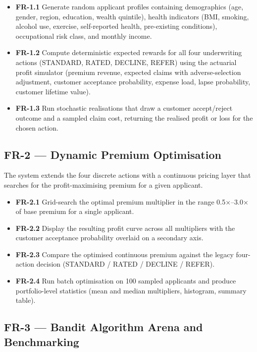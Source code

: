 \begin{itemize}
\tightlist
\item
  \textbf{FR-1.1} Generate random applicant profiles containing demographics (age, gender, region, education, wealth quintile), health indicators (BMI, smoking, alcohol use, exercise, self-reported health, pre-existing conditions), occupational risk class, and monthly income.
\item
  \textbf{FR-1.2} Compute deterministic expected rewards for all four underwriting actions (STANDARD, RATED, DECLINE, REFER) using the actuarial profit simulator (premium revenue, expected claims with adverse-selection adjustment, customer acceptance probability, expense load, lapse probability, customer lifetime value).
\item
  \textbf{FR-1.3} Run stochastic realisations that draw a customer accept/reject outcome and a sampled claim cost, returning the realised profit or loss for the chosen action.
\end{itemize}

\subsection{FR-2 --- Dynamic Premium Optimisation}\label{fr-2-dynamic-premium-optimisation}

The system extends the four discrete actions with a continuous pricing layer that searches for the profit-maximising premium for a given applicant.

\begin{itemize}
\tightlist
\item
  \textbf{FR-2.1} Grid-search the optimal premium multiplier in the range 0.5×--3.0× of base premium for a single applicant.
\item
  \textbf{FR-2.2} Display the resulting profit curve across all multipliers with the customer acceptance probability overlaid on a secondary axis.
\item
  \textbf{FR-2.3} Compare the optimised continuous premium against the legacy four-action decision (STANDARD / RATED / DECLINE / REFER).
\item
  \textbf{FR-2.4} Run batch optimisation on 100 sampled applicants and produce portfolio-level statistics (mean and median multipliers, histogram, summary table).
\end{itemize}

\subsection{FR-3 --- Bandit Algorithm Arena and Benchmarking}\label{fr-3-bandit-algorithm-arena-and-benchmarking}

